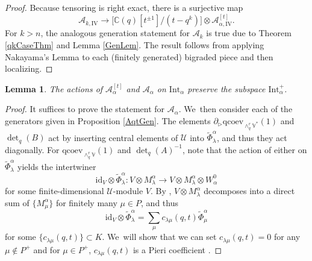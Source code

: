 \documentclass[11pt]{article}
\newtheorem{lem}[thm]{Lemma}
\theoremstyle{definition}
\newcommand{\CC}{\mathbb{C}}
\newcommand{\UU}{\mathcal{U}}
\newcommand{\AAA}{\mathcal{A}}
\begin{document}
\begin{proof}
Because tensoring is right exact, there is a surjective map
\[
\AAA_{k,\mathrm{IV}}\to \bigl[ \CC(q)[t^{\pm 1}]\big/ (t-q^k) \bigr]\otimes\AAA_{\alpha,\mathrm{IV}}^{[t]}.
\]
For $k>n$, the analogous generation statement for $\AAA_k$ is true due to Theorem \ref{qkCaseThm} and Lemma \ref{GenLem}.
The result follows from applying Nakayama's Lemma to each (finitely generated) bigraded piece and then localizing.
\end{proof}

\begin{lem}
The actions of $\AAA_\alpha^{[t]}$ and $\AAA_\alpha$ on $\mathrm{Int}_\alpha$ preserve the subspace $\mathrm{Int}_\alpha^+$.
\end{lem}

\begin{proof}
It suffices to prove the statement for $\AAA_\alpha$. We~then consider each of the generators given in Proposition \ref{AqtGen}.
The elements $\partial_\triangleright\mathrm{qcoev}_{\wedge_q^r\mathbb{V}^*}(1)$ and $\det_q(B)$ act by inserting central elements of $\UU$ into $\widetilde{\Phi}_\lambda^\alpha$, and thus they act diagonally.
For $\mathrm{qcoev}_{\wedge^r_q\mathbb{V}}(1)$ and $\det_q(A)^{-1}$, note that the action of either on $\widetilde{\Phi}_\lambda^\alpha$ yields the intertwiner
\[
\mathrm{id}_V\otimes\widetilde{\Phi}_\lambda^\alpha: V\otimes M_\lambda^\alpha\to V\otimes M_\lambda^\alpha\otimes W_\alpha^0
\]
for some finite-dimensional $\UU$-module $V$.
By \cite[Lem.\,5]{BGGHWt}, $V\otimes M_\lambda^\alpha$ decomposes into a direct sum of $\{M_\mu^\alpha\}$ for finitely many $\mu\in P$, and thus
\[
\mathrm{id}_V\otimes\widetilde{\Phi}_\lambda^\alpha=\sum_{\mu}c_{\lambda\mu}(q,t)\widetilde{\Phi}_\mu^\alpha
\]
for some $\{c_{\lambda\mu}(q,t)\}\subset K$. We~will show that we can set $c_{\lambda\mu}(q,t)=0$ for any $\mu\not\in P^+$ and for $\mu\in P^+$, $c_{\lambda\mu}(q,t)$ is a Pieri coefficient \cite[VI.6]{MacBook}.


\end{proof}
\end{document}
